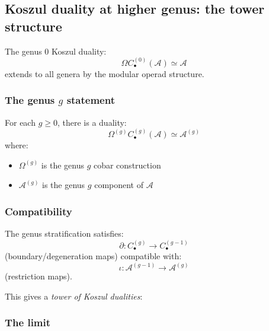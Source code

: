 \subsection{Koszul duality at higher genus: the tower structure}
\label{app:koszul-reference-higher-genus}

The genus 0 Koszul duality:
\[\Omega C_{\bullet}^{(0)}(\mathcal{A}) \simeq \mathcal{A}\]
extends to all genera by the modular operad structure.

\subsubsection{\texorpdfstring{The genus $g$ statement}{The genus g statement}}

For each $g \geq 0$, there is a duality:
\[\Omega^{(g)} C_{\bullet}^{(g)}(\mathcal{A}) \simeq \mathcal{A}^{(g)}\]
where:
\begin{itemize}
\item $\Omega^{(g)}$ is the genus $g$ cobar construction
\item $\mathcal{A}^{(g)}$ is the genus $g$ component of $\mathcal{A}$
\end{itemize}

\subsubsection{Compatibility}

The genus stratification satisfies:
\[\partial: C_{\bullet}^{(g)} \to C_{\bullet}^{(g-1)}\]
(boundary/degeneration maps) compatible with:
\[\iota: \mathcal{A}^{(g-1)} \to \mathcal{A}^{(g)}\]
(restriction maps).

This gives a \emph{tower of Koszul dualities}:
\begin{center}
\end{center}

\subsubsection{The limit}


